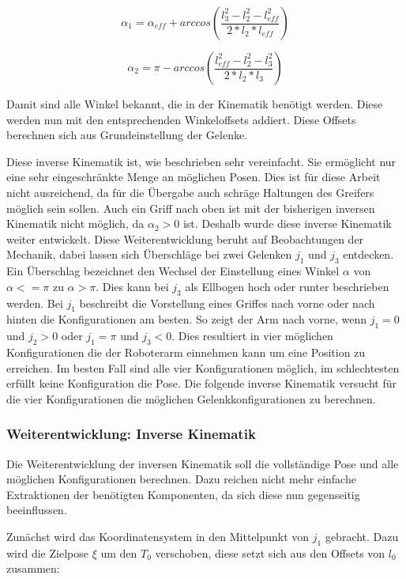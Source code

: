 \begin{equation}
\alpha_1 = \alpha_{eff} + arccos(\dfrac{l_3^2-l_2^2-l_{eff}^2}{2*l_2*l_{eff}})
\label{eq:13}
\end{equation}

\begin{equation}
\alpha_2 = \pi - arccos(\dfrac{l_{eff}^2-l_2^2-l_{3}^2}{2*l_2*l_3})
\label{eq:14}
\end{equation}

Damit sind alle Winkel bekannt, die in der Kinematik benötigt werden. Diese werden nun mit den entsprechenden Winkeloffsets addiert. Diese Offsets berechnen sich aus Grundeinstellung der Gelenke.

Diese inverse Kinematik ist, wie beschrieben sehr vereinfacht. Sie ermöglicht nur eine sehr eingeschränkte Menge an möglichen Posen. Dies ist für diese Arbeit nicht ausreichend, da für die Übergabe auch schräge Haltungen des Greifers möglich sein sollen. Auch ein Griff nach oben ist mit der bisherigen inversen Kinematik nicht möglich, da $\alpha_2 > 0$ ist. Deshalb wurde diese inverse Kinematik weiter entwickelt. Diese Weiterentwicklung beruht auf Beobachtungen der Mechanik, dabei lassen sich Überschläge bei zwei Gelenken $j_1$ und $j_3$ entdecken. Ein Überschlag bezeichnet den Wechsel der Einstellung eines Winkel $\alpha$ von $\alpha <= \pi$ zu $\alpha > \pi$. Dies kann bei $j_3$ als Ellbogen hoch oder runter beschrieben werden. Bei $j_1$ beschreibt die Vorstellung eines Griffes nach vorne oder nach hinten die Konfigurationen am besten. So zeigt der Arm nach vorne, wenn $j_1 = 0$ und $j_2 > 0$ oder $j_1 = \pi$ und $j_3 < 0$. Dies resultiert in vier möglichen Konfigurationen die der Roboterarm einnehmen kann um eine Position zu erreichen. Im besten Fall sind alle vier Konfigurationen möglich, im schlechtesten erfüllt keine Konfiguration die Pose. Die folgende inverse Kinematik versucht für die vier Konfigurationen die möglichen Gelenkkonfigurationen zu berechnen.

\subsubsection{Weiterentwicklung: Inverse Kinematik}
Die Weiterentwicklung der inversen Kinematik soll die vollständige Pose und alle möglichen Konfigurationen berechnen. Dazu reichen nicht mehr einfache Extraktionen der benötigten Komponenten, da sich diese nun gegenseitig beeinflussen. 

Zunächst wird das Koordinatensystem in den Mittelpunkt von $j_1$ gebracht. Dazu wird die Zielpose $\xi$ um den $T_0$ verschoben, diese setzt sich aus den Offsets von $l_0$ zusammen:

